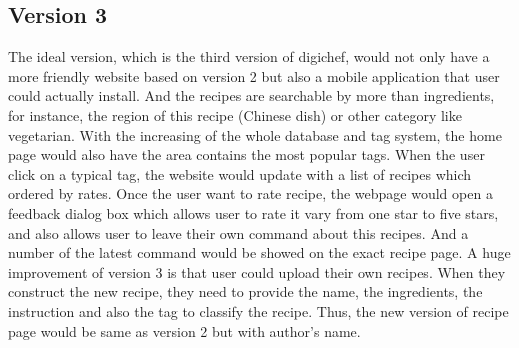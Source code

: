\subsection{Version 3}
The ideal version, which is the third version of digichef, would not only have a more friendly website based on version 2 but also a mobile application that user could actually install. And the recipes are searchable by more than ingredients, for instance, the region of this recipe (Chinese dish) or other category like vegetarian. 
With the increasing of the whole database and tag system, the home page would also have the area contains the most popular tags. When the user click on a typical tag, the website would update with a list of recipes which ordered by rates. 
Once the user want to rate recipe, the webpage would open a feedback dialog box which allows user to rate it vary from one star to five stars, and also allows user to leave their own command about this recipes. And a number of the latest command would be showed on the exact recipe page. 
A huge improvement of version 3 is that user could upload their own recipes. When they construct the new recipe, they need to provide the name, the ingredients, the instruction and also the tag to classify the recipe. Thus, the new version of recipe page would be same as version 2 but with author’s name. 

